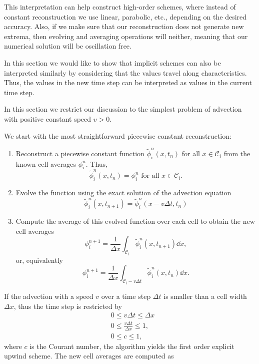 \documentclass[../thesis.tex]{subfiles}
\begin{document}
This interpretation can help construct high-order schemes, where instead of constant
reconstruction we use linear, parabolic, etc., depending on the desired accuracy.
Also, if we make sure that our reconstruction does not generate new extrema, then evolving and averaging operations will neither, meaning that our numerical solution
will be oscillation free.

In this section we would like to show that implicit schemes can also be interpreted similarly by considering that the values travel along characteristics. Thus, the
values in the new time step can be interpreted as values in the current time step.

In this section we restrict our discussion to the simplest problem of advection with positive constant speed \(v > 0\).

We start with the most straightforward piecewise constant reconstruction:
\begin{enumerate}
    \item Reconstruct a piecewise constant function \(\tilde{\phi}_{i}^{n}(x,t_n)\) for all \(x \in \mathcal{C}_i\) from the known cell averages \(\phi_{i}^{n}\).
    Thus,
    \[
        \tilde{\phi}_{i}^{n}(x,t_n) = \phi_{i}^{n} \text{ for all } x \in \mathcal{C}_i.
    \]
    \item Evolve the function using the exact solution of the advection equation
    \[
        \tilde{\phi}_{i}^{n}(x,t_{n+1}) = \tilde{\phi}_{i}^{n}(x - v\Delta t,t_{n})
    \]
    \item Compute the average of this evolved function over each cell to obtain the new cell averages
    \[
        \phi_{i}^{n+1} =\frac{1}{\Delta x}\int_{\mathcal{C}_i}\tilde{\phi}_{i}^{n}(x,t_{n+1}) \dd{x},
    \]
    or, equivalently
    \[
        \phi_{i}^{n+1} =\frac{1}{\Delta x}\int_{\mathcal{C}_i-v\Delta t}\tilde{\phi}_{i}^{n}(x,t_{n}) \dd{x}.
    \]
\end{enumerate}
If the advection with a speed \(v\) over a time step \(\Delta t\) is smaller than a cell width \(\Delta x\), thus the time step is restricted by
\begin{equation}\label{eqn:cfl-1}
    \begin{split}
        &0 \leq v\Delta t \leq \Delta x
        \\
        &0 \leq \frac{v\Delta t}{\Delta x} \leq 1,
        \\
        &0 \leq c \leq 1,
    \end{split}
\end{equation}
where \(c\) is the Courant number, the algorithm yields the first order explicit upwind scheme. The new cell averages are computed as
\end{document}
